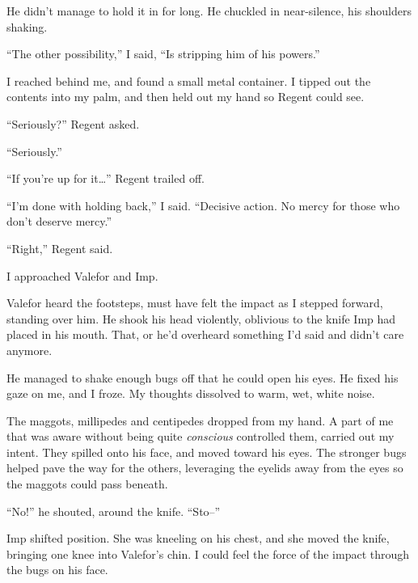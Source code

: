 He didn't manage to hold it in for long.  He chuckled in near-silence, his shoulders shaking.



``The other possibility,'' I said, ``Is stripping him of his powers.''



I reached behind me, and found a small metal container.  I tipped out the contents into my palm, and then held out my hand so Regent could see.



``Seriously?'' Regent asked.



``Seriously.''



``If you're up for it\ldots'' Regent trailed off.



``I'm done with holding back,'' I said.  ``Decisive action.  No mercy for those who don't deserve mercy.''



``Right,'' Regent said.



I approached Valefor and Imp.



Valefor heard the footsteps, must have felt the impact as I stepped forward, standing over him.  He shook his head violently, oblivious to the knife Imp had placed in his mouth.   That, or he'd overheard something I'd said and didn't care anymore.



He managed to shake enough bugs off that he could open his eyes.  He fixed his gaze on me, and I froze.  My thoughts dissolved to warm, wet, white noise.



The maggots, millipedes and centipedes dropped from my hand.  A part of me that was aware without being quite \emph{conscious} controlled them, carried out my intent.  They spilled onto his face, and moved toward his eyes.  The stronger bugs helped pave the way for the others, leveraging the eyelids away from the eyes so the maggots could pass beneath.



``No!'' he shouted, around the knife.  ``Sto--''



Imp shifted position.  She was kneeling on his chest, and she moved the knife, bringing one knee into Valefor's chin.  I could feel the force of the impact through the bugs on his face.



